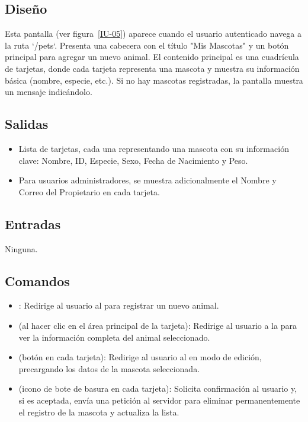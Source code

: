 \subsection{Diseño}
    Esta pantalla  (ver figura~\ref{IU-05}) aparece cuando el usuario autenticado navega a la ruta `/pets`. Presenta una cabecera con el título "Mis Mascotas" y un botón principal para agregar un nuevo animal. El contenido principal es una cuadrícula de tarjetas, donde cada tarjeta representa una mascota y muestra su información básica (nombre, especie, etc.). Si no hay mascotas registradas, la pantalla muestra un mensaje indicándolo.


\subsection{Salidas}
\begin{itemize}
    \item Lista de tarjetas, cada una representando una mascota con su información clave: Nombre, ID, Especie, Sexo, Fecha de Nacimiento y Peso.
    \item Para usuarios administradores, se muestra adicionalmente el Nombre y Correo del Propietario en cada tarjeta.
\end{itemize}

\subsection{Entradas}
    Ninguna.

\subsection{Comandos}
\begin{itemize}
    \item {}: Redirige al usuario al  para registrar un nuevo animal.
    \item {} (al hacer clic en el área principal de la tarjeta): Redirige al usuario a la  para ver la información completa del animal seleccionado.
    \item {} (botón en cada tarjeta): Redirige al usuario al  en modo de edición, precargando los datos de la mascota seleccionada.
    \item {} (icono de bote de basura en cada tarjeta): Solicita confirmación al usuario y, si es aceptada, envía una petición al servidor para eliminar permanentemente el registro de la mascota y actualiza la lista.
\end{itemize}

